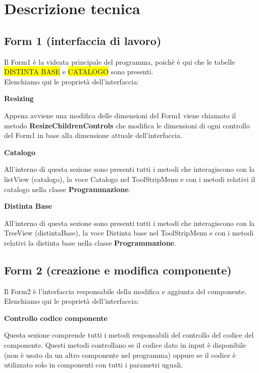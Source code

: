 \documentclass[12pt,twoside]{report}
\begin{document}

\section{Descrizione tecnica}
\subsection{Form 1 (interfaccia di lavoro)}

Il Form1 è la videata principale del programma, poichè è qui che le tabelle \colorbox{yellow}{DISTINTA BASE} e \colorbox{yellow}{CATALOGO} sono presenti.\\
Elenchiamo qui le proprietà dell'interfaccia:

\bigskip
\textbf{Resizing}

Appena avviene una modifica delle dimensioni del Form1 viene chiamato il metodo \textbf{ResizeChildrenControls} che modifica le dimensioni di ogni controllo del Form1 in base alla dimensione attuale dell’interfaccia.

\bigskip 
\textbf{Catalogo}

All’interno di questa sezione sono presenti tutti i metodi che interagiscono con la listView (catalogo), la voce Catalogo nel ToolStripMenu e con i metodi relativi il catalogo nella classe \textbf{Programmazione}. 

\bigskip 
\textbf{Distinta Base}

All’interno di questa sezione sono presenti tutti i metodi che interagiscono con la TreeView (distintaBase), la voce Distinta base nel ToolStripMenu e con i metodi relativi la distinta base nella classe \textbf{Programmazione}.

\subsection{Form 2 (creazione e modifica componente)}

Il Form2 è l'interfaccia responsabile della modifica e aggiunta del componente. \\
Elenchiamo qui le proprietà dell’interfaccia:

\bigskip 
\textbf{Controllo codice componente}

Questa sezione comprende tutti i metodi responsabili del controllo del codice del componente. Questi metodi controllano se il codice dato in input è disponibile (non è usato da un altro componente nel programma) oppure se il codice è utilizzato solo in componenti con tutti i parametri uguali.
\end{document}
